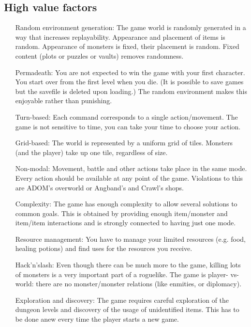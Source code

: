 \documentclass{article}
\begin{document}
\subsection*{High value factors}
\begin{itemize}

\item[Random environment generation:]
The game world is randomly generated in a way that increases 
replayability. Appearance and placement of items is random. 
Appearance of monsters is fixed, their placement is random. 
Fixed content (plots or puzzles or vaults) removes randomness. 

\item[Permadeath:] 
 You are not expected to win the game with your first character. You 
start over from the first level when you die. (It is possible to save 
games but the savefile is deleted upon loading.) The random 
environment makes this enjoyable rather than punishing. 

\item[Turn-based:]
Each command corresponds to a single action/movement. The game is not 
sensitive to time, you can take your time to choose your action.   

\item[Grid-based:] 
The world is represented by a uniform grid of tiles. Monsters (and 
the player) take up one tile, regardless of size. 

\item[Non-modal:] 
Movement, battle and other actions take place in the same mode. Every 
action should be available at any point of the game. Violations to 
this are ADOM's overworld or Angband's and Crawl's shops. 

\item[Complexity:] 
The game has enough complexity to allow several solutions to common 
goals. This is obtained by providing enough item/monster and item/item 
interactions and is strongly connected to having just one mode. 

\item[Resource management:] 
You have to manage your limited resources (e.g. food, healing potions) 
and find uses for the resources you receive. 

\item[Hack'n'slash:]
Even though there can be much more to the game, killing lots of 
monsters is a very important part of a roguelike. The game is player- 
vs-world: there are no monster/monster relations (like enmities, or 
diplomacy).  

\item[Exploration and discovery:] 
The game requires careful exploration of the dungeon levels and 
discovery of the usage of unidentified items. This has to be done anew 
every time the player starts a new game.

\end{itemize}
\end{document}
